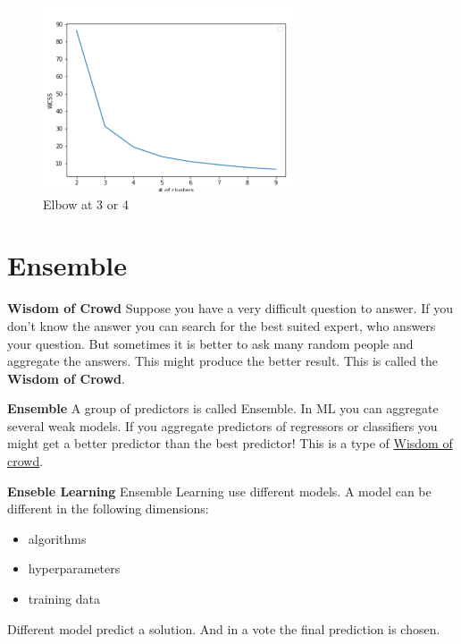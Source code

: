 \documentclass[11pt,twoside,landscape]{article}
\begin{document}
\begin{multicols}{3}
\begin{figure}[htbp]
\centering
\includegraphics[width=.9\linewidth]{img/elbow_method.png}
\caption{Elbow at 3 or 4}
\end{figure}

\section{Ensemble}
\label{sec:orgfc4a48a}
\textbf{Wisdom of Crowd}
Suppose you have a very difficult question to answer.
If you don't know the answer you can search for the best suited expert, who answers your question.
But sometimes it is better to ask many random people and aggregate the answers.
This might produce the better result.
This is called the \textbf{Wisdom of Crowd}.

\textbf{Ensemble}
A group of predictors is called Ensemble.
In ML you can aggregate several weak models.
If you aggregate predictors of regressors or classifiers you might get a better predictor than the best predictor!
This is a type of \href{../../../roam/20211228083830-wisdom_of_crowd.org}{Wisdom of crowd}.

\textbf{Enseble Learning}
Ensemble Learning use different models.
A model can be different in the following dimensions:
\begin{itemize}
\item algorithms
\item hyperparameters
\item training data
\end{itemize}


Different model predict a solution.
And in a vote the final prediction is chosen.


\end{multicols}
\end{document}
